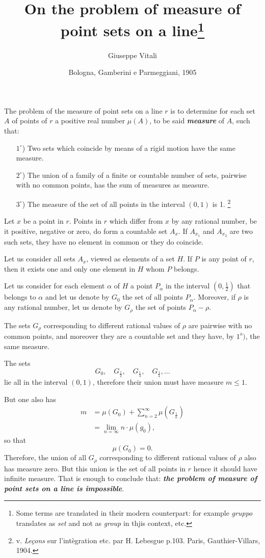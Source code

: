 \documentclass{article}
\title{On the problem of measure of point sets on a line\thanks{Some terms are translated in their modern counterpart: for example {\em gruppo} translates as {\em set} and not as {\em group} in thjis context, etc.}}
\author{Giuseppe Vitali}
\date{\small Bologna, Gamberini e Parmeggiani, 1905}
\begin{document}
\maketitle

The problem of the measure of point sets on a line $r$ is to determine for each set $A$ of points of $r$ a positive real number $\mu(A)$, to be said \emph{\bfseries measure} of $A$, such that:

\begin{itemize}
	\item[$1^\circ$)] Two sets which coincide by means of a rigid motion have the same measure.
	\item[$2^\circ$)] The union of a family of a finite or countable number of sets, pairwise with no common points, has the sum of measures as measure.
	\item[$3^\circ$)] The measure of the set of all points in the interval $(0,1)$ is 1. \footnote{ v. {\em Le\c cons} sur l'int\`egration etc. par H. Lebesgue p.103. Paris, Gauthier-Villars, 1904.}
\end{itemize}

Let $x$ be a point in $r$. Points in $r$ which differ from $x$ by any rational number, be it positive, negative or zero, do form a countable set $A_x$. If $A_{x_1}$ and $A_{x_2}$ are two such sets, they have no element in common or they do coincide.

Let us consider all sets $A_x$, viewed as elements of a set $H$. If $P$ is any point of $r$, then it exists one and only one element in $H$ whom $P$ belongs.

Let us consider for each element $\alpha$ of $H$ a point $P_\alpha$ in the interval $(0,\frac12)$ that belongs to $\alpha$ and let us denote by $G_0$ the set of all points $P_\alpha$. Moreover, if $\rho$ is any rational number, let us denote by $G_\rho$ the set of points $P_\alpha-\rho$.

The sets $G_\rho$ corresponding to different rational values of $\rho$ are pairwise with no common points, and moreover they are a countable set and they have, by $1^\textrm{a})$, the same measure.

The sets
\[
	G_0, \quad G_{\frac12}, \quad G_{\frac13}, \quad G_{\frac14}, \dots
\]
lie all in the interval $(0,1)$, therefore their union must have measure $m\leq1$.

But one also has
\begin{align*}
	m &= \mu(G_0) + \sum_{n=2}^\infty \mu\left(G_{\frac1n}\right) \\
		&= \lim_{n=\infty} n\cdot\mu(g_0),
\end{align*}
so that
\[
	\mu(G_0)=0.
\]
Therefore, the union of all $G_\rho$ corresponding to different rational values of $\rho$ also has measure zero. But this union is the set of all points in $r$ hence it should have infinite measure. That is enough to conclude that: \emph{\bfseries the problem of measure of point sets on a line is impossible}.
\end{document}
